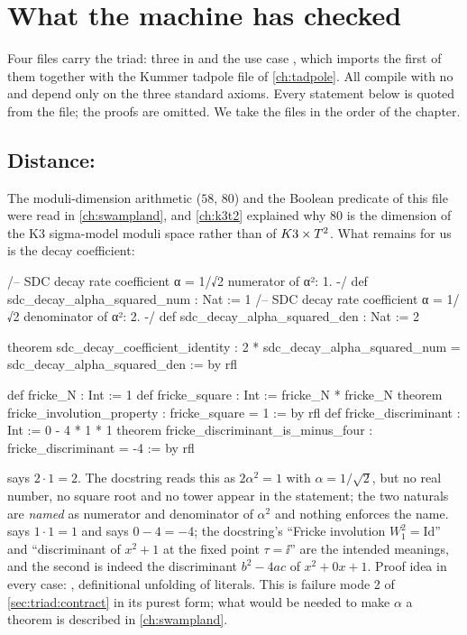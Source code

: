 \section{What the machine has checked}\label{sec:triad:lean}

Four files carry the triad: three in  and the
use case , which imports the first of
them together with the Kummer tadpole file of \cref{ch:tadpole}. All compile with no
 and depend only on the three standard axioms. Every statement below is quoted from
the file; the proofs are omitted. We take the files in the order of the chapter.

\subsection{Distance: }

The moduli-dimension arithmetic ($58$, $80$) and the Boolean predicate
 of this file were read in \cref{ch:swampland}, and \cref{ch:k3t2}
explained why $80$ is the dimension of the K3 sigma-model moduli space rather than of $K3\times T^2$.
What remains for us is the decay coefficient:
\begin{leancode}
/-- SDC decay rate coefficient α = 1/√2 numerator of α²: 1. -/
def sdc_decay_alpha_squared_num : Nat := 1
/-- SDC decay rate coefficient α = 1/√2 denominator of α²: 2. -/
def sdc_decay_alpha_squared_den : Nat := 2

theorem sdc_decay_coefficient_identity :
    2 * sdc_decay_alpha_squared_num = sdc_decay_alpha_squared_den := by rfl

def fricke_N : Int := 1
def fricke_square : Int := fricke_N * fricke_N
theorem fricke_involution_property : fricke_square = 1 := by rfl
def fricke_discriminant : Int := 0 - 4 * 1 * 1
theorem fricke_discriminant_is_minus_four : fricke_discriminant = -4 := by rfl
\end{leancode}
\begin{leanbox}
 says $2\cdot1=2$. The docstring reads this as
$2\alpha^2=1$ with $\alpha=1/\sqrt2$, but no real number, no square root and no tower appear
in the statement; the two naturals are \emph{named} as numerator and denominator of
$\alpha^2$ and nothing enforces the name.  says $1\cdot1=1$
and  says $0-4=-4$; the docstring's ``Fricke
involution $W_1^2=\mathrm{Id}$'' and ``discriminant of $x^2+1$ at the fixed point $\tau=\ii$''
are the intended meanings, and the second is indeed the discriminant $b^2-4ac$ of
$x^2+0x+1$. Proof idea in every case: , definitional unfolding of literals. This is
failure mode 2 of \cref{sec:triad:contract} in its purest form; what would be needed to make
$\alpha$ a theorem is described in \cref{ch:swampland}.
\end{leanbox}

